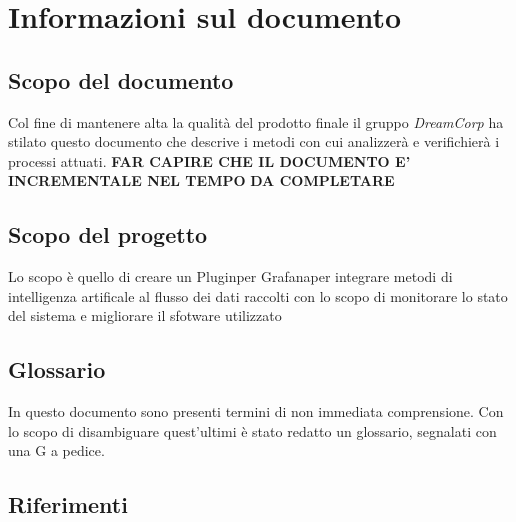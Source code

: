 \section{Informazioni sul documento}
\subsection{Scopo del documento}
 Col fine di mantenere alta la qualità del prodotto finale il gruppo \textit{DreamCorp} ha stilato questo documento che descrive i metodi con cui analizzerà e verifichierà i processi attuati. \textbf{FAR CAPIRE CHE IL DOCUMENTO E' INCREMENTALE NEL TEMPO}
 \textbf{DA COMPLETARE}
 \subsection{Scopo del progetto}
 Lo scopo è quello di creare un Plugin\pedice per Grafana\pedice per integrare metodi di intelligenza artificale al flusso dei dati raccolti con lo scopo di monitorare lo stato del sistema e migliorare il sfotware utilizzato
 \subsection{Glossario}
 In questo documento sono presenti termini di non immediata comprensione. Con lo scopo di disambiguare quest'ultimi è stato redatto un glossario, segnalati con una G a pedice.

 \newpage
 \subsection{Riferimenti}
